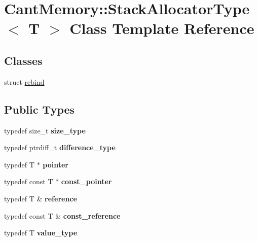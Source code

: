 \hypertarget{classCantMemory_1_1StackAllocatorType}{}\section{Cant\+Memory\+:\+:Stack\+Allocator\+Type$<$ T $>$ Class Template Reference}
\label{classCantMemory_1_1StackAllocatorType}
\subsection*{Classes}
\begin{DoxyCompactItemize}
\item 
struct \hyperlink{structCantMemory_1_1StackAllocatorType_1_1rebind}{rebind}
\end{DoxyCompactItemize}
\subsection*{Public Types}
\begin{DoxyCompactItemize}
\item 
\mbox{\label{classCantMemory_1_1StackAllocatorType_a351175b4e2462665dbc625be666b49a7}} 
typedef size\+\_\+t {\bfseries size\+\_\+type}
\item 
\mbox{\label{classCantMemory_1_1StackAllocatorType_a95be88cdccfac9b663f5fcb7d7d5c910}} 
typedef ptrdiff\+\_\+t {\bfseries difference\+\_\+type}
\item 
\mbox{\label{classCantMemory_1_1StackAllocatorType_a868943038fba75f20ef66267e0810813}} 
typedef T $\ast$ {\bfseries pointer}
\item 
\mbox{\label{classCantMemory_1_1StackAllocatorType_a2b77db59c0d3337ce5a21e86f4b1a230}} 
typedef const T $\ast$ {\bfseries const\+\_\+pointer}
\item 
\mbox{\label{classCantMemory_1_1StackAllocatorType_ae564113067b33b97af10b3684d5d6464}} 
typedef T \& {\bfseries reference}
\item 
\mbox{\label{classCantMemory_1_1StackAllocatorType_a59d9f8f565b224cc05973f0123564507}} 
typedef const T \& {\bfseries const\+\_\+reference}
\item 
\mbox{\label{classCantMemory_1_1StackAllocatorType_a76ef077dad825cdbaf4f0e3f1eb213ba}} 
typedef T {\bfseries value\+\_\+type}
\end{DoxyCompactItemize}
